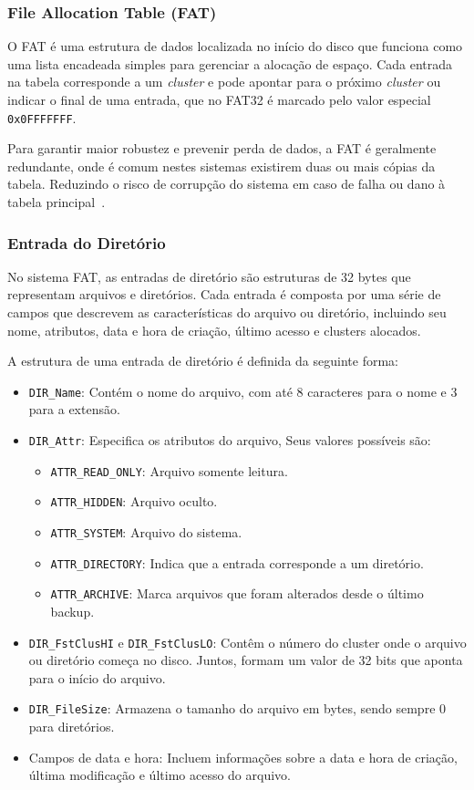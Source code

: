 \documentclass[
    12pt,				%
    oneside,   	        %
    a4paper,			%
    english,			%
    french,				%
    spanish,			%
    brazil,				%
    ]{pacotes/abntex2}
\begin{document}
\subsubsection{File Allocation Table (FAT)}
\label{subsubsec:fat}

O FAT é uma estrutura de dados localizada no início do disco que funciona como uma lista encadeada simples para gerenciar a alocação de espaço. Cada entrada na tabela corresponde a um \textit{cluster} e pode apontar para o próximo \textit{cluster} ou indicar o final de uma entrada, que no FAT32 é marcado pelo valor especial \texttt{0x0FFFFFFF}.

Para garantir maior robustez e prevenir perda de dados, a FAT é geralmente redundante, onde é comum nestes sistemas existirem duas ou mais cópias da tabela. Reduzindo o risco de corrupção do sistema em caso de falha ou dano à tabela principal~\cite{microsoft2000}.

\subsubsection{Entrada do Diretório}
\label{subsubsec:dentry}

No sistema FAT, as entradas de diretório são estruturas de 32 bytes que representam arquivos e diretórios. Cada entrada é composta por uma série de campos que descrevem as características do arquivo ou diretório, incluindo seu nome, atributos, data e hora de criação, último acesso e clusters alocados.

A estrutura de uma entrada de diretório é definida da seguinte forma:

\begin{itemize} 
    \item \texttt{DIR\_Name}: Contém o nome do arquivo, com até 8 caracteres para o nome e 3 para a extensão.
    \item \texttt{DIR\_Attr}: Especifica os atributos do arquivo, Seus valores possíveis são:
    \begin{itemize} 
        \item \texttt{ATTR\_READ\_ONLY}: Arquivo somente leitura.
        \item \texttt{ATTR\_HIDDEN}: Arquivo oculto.
        \item \texttt{ATTR\_SYSTEM}: Arquivo do sistema.
        \item \texttt{ATTR\_DIRECTORY}: Indica que a entrada corresponde a um diretório.
        \item \texttt{ATTR\_ARCHIVE}: Marca arquivos que foram  alterados desde o último backup.
    \end{itemize}
    \item \texttt{DIR\_FstClusHI} e \texttt{DIR\_FstClusLO}: Contêm o número do cluster onde o arquivo ou diretório começa no disco. Juntos, formam um valor de 32 bits que aponta para o início do arquivo. 
    \item \texttt{DIR\_FileSize}: Armazena o tamanho do arquivo em bytes, sendo sempre 0 para diretórios. 
    \item Campos de data e hora: Incluem informações sobre a data e hora de criação, última modificação e último acesso do arquivo.
\end{itemize}
\end{document}
